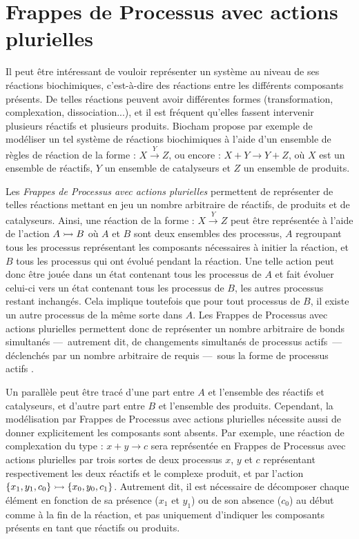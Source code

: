 \section{Frappes de Processus avec actions plurielles}

Il peut être intéressant de vouloir représenter un système au niveau de ses réactions biochimiques,
c'est-à-dire des réactions entre les différents composants présents.
De telles réactions peuvent avoir différentes formes (transformation, complexation, dissociation...),
et il est fréquent qu'elles fassent intervenir plusieurs réactifs et plusieurs produits.
Biocham  propose par exemple de modéliser un tel système de réactions biochimiques à l'aide
d'un ensemble de règles de réaction de la forme :
$X \xrightarrow{Y} Z$,
ou encore :
$X + Y \rightarrow Y + Z$,
où $X$ est un ensemble de réactifs, $Y$ un ensemble de catalyseurs et $Z$ un ensemble de produits.

Les \emph{Frappes de Processus avec actions plurielles} permettent de représenter de telles réactions
mettant en jeu un nombre arbitraire de réactifs, de produits et de catalyseurs.
Ainsi, une réaction de la forme : $X \xrightarrow{Y} Z$
peut être représentée à l'aide de l'action $\mbox{$A \rightarrowtail B$}$
où $A$ et $B$ sont deux ensembles des processus,
$A$ regroupant tous les processus représentant les composants nécessaires à initier la réaction,
et $B$ tous les processus qui ont évolué pendant la réaction.
Une telle action peut donc être jouée dans un état contenant tous les processus de $A$
et fait évoluer celui-ci vers un état contenant tous les processus de $B$, %
les autres processus restant inchangés. %
Cela implique toutefois que pour tout processus de $B$, il existe un autre processus de la même
sorte dans $A$.
Les Frappes de Processus avec actions plurielles permettent donc de représenter
un nombre arbitraire de bonds simultanés
---~autrement dit, de changements simultanés de processus actifs~---
déclenchés par un nombre arbitraire de requis
---~sous la forme de processus actifs .

Un parallèle peut être tracé d'une part entre $A$ et l'ensemble des réactifs et catalyseurs,
et d'autre part entre $B$ et l'ensemble des produits.
Cependant, la modélisation par Frappes de Processus avec actions plurielles
nécessite aussi de donner explicitement les composants sont absents.
Par exemple, une réaction de complexation du type : $x + y \rightarrow c$ %
sera représentée en Frappes de Processus avec actions plurielles par trois sortes de deux processus
$x$, $y$ et $c$ représentant respectivement les deux réactifs et le complexe produit,
et par l'action $\mbox{$\{x_1, y_1, c_0\} \rightarrowtail \{x_0, y_0, c_1\}$}$.
Autrement dit, il est nécessaire de décomposer chaque élément en fonction de sa présence
($x_1$ et $y_1$)
ou de son absence ($c_0$) au début comme à la fin de la réaction,
et pas uniquement d'indiquer les composants présents en tant que réactifs ou produits.

